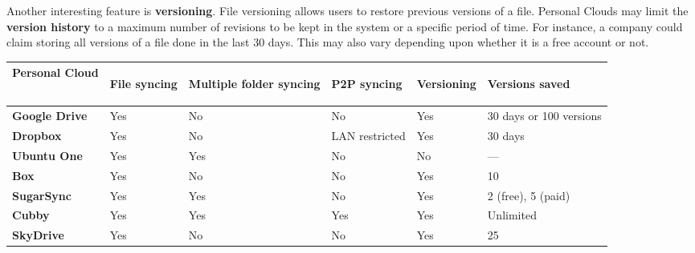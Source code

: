 Another interesting feature is \textbf{versioning}. File versioning allows users to restore previous versions of a file. Personal Clouds may limit the \textbf{version history} to a maximum number of revisions to be kept in the system or a specific period of time. For instance, a company could claim storing all versions of a file done in the last 30 days. This may also vary depending upon whether it is a free account or not.


{
\def\arraystretch{1.5}

\begin{table}
\begin{center}
    \begin{tabular}{ | p{3.3cm} | p{1.4cm} | p{1.4cm} | p{2.4cm} | p{1.4cm} | p{2.9cm} | }
    \hline
    \rowcolor[gray]{0.8}

	\textbf{Personal Cloud} &
	\begin{sideways}\textbf{File syncing}\end{sideways} &
	\begin{sideways}\textbf{Multiple folder syncing}\end{sideways} &
	\begin{sideways}\textbf{P2P syncing}\end{sideways} & 
	\begin{sideways}\textbf{Versioning}\end{sideways} & 
	\begin{sideways}\textbf{Versions saved}\end{sideways} \\ \hline

	\textbf{Google Drive} &
	Yes &
	No &
	No &
	Yes &
	30 days or 100 versions \\ \hline

	\textbf{Dropbox} &
	Yes &
	No &
	LAN restricted &
	Yes &
	30 days \\ \hline
	
	\textbf{Ubuntu One} &
	Yes &
	Yes &
	No &
	No &
	--- \\ \hline
	
	\textbf{Box} &
	Yes &
	No & 
	No &
	Yes &
	10 \\ \hline
	
	\textbf{SugarSync} & 
	Yes &
	Yes &
	No &
	Yes &
	2 (free), 5 (paid) \\ \hline
	
	\textbf{Cubby} &
	Yes &
	Yes &
	Yes &
	Yes &
	Unlimited \\ \hline
	
	\textbf{SkyDrive} & 
	Yes &
	No &
	No &
	Yes &
	25 \\ \hline


\end{tabular}
\end{center}
\end{table}}
